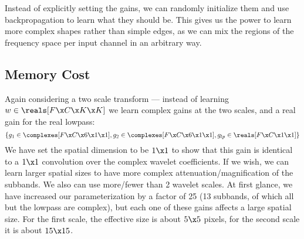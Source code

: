 \documentclass[9pt]{article}
\begin{document}
Instead of explicitly setting the gains, we can randomly initialize them and use backpropagation to
learn what they should be. This gives us the power to learn more complex shapes rather than simple
edges, as we can mix the regions of the frequency space per input channel in an arbitrary way. 

\subsection{Memory Cost}
Again considering a two scale transform --- instead of learning $w\in \reals[F \x C\x K\x K]$ we
learn complex gains at the two scales, and a real gain for the real lowpass:
$$\left\{g_1 \in \complexes[F\x C\x 6\x 1\x 1], g_2 \in \complexes[F\x C\x 6\x 1\x 1], g_{lp} \in \reals[F\x C\x 1\x 1]
  \right\}$$ 
We have set the spatial dimension to be $1\x 1$ to show that this gain is identical to a $1\x 1$ 
convolution over the complex wavelet coefficients. If we wish, we can learn larger spatial sizes to have more complex
attenuation/magnification of the subbands. We also can use more/fewer than 2 wavelet scales.  At first
glance, we have increased our parameterization by a factor of 25 (13 subbands, of which all but the
lowpass are complex), but each one of these gains affects a large spatial size. For the first scale,
the effective size is about $5\x 5$ pixels, for the second scale it is about $15\x 15$.
\end{document}
